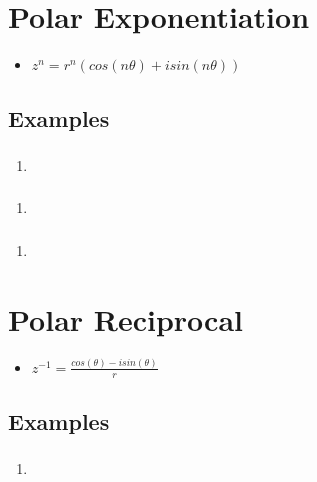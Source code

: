 \documentclass{report}
\renewcommand{\sin}[1]{sin(#1)}
\renewcommand{\cos}[1]{cos(#1)}
\begin{document}
        \section{Polar Exponentiation}
            \begin{itemize}
                \item $z^n=r^n(\cos{n\theta}+i\sin{n\theta})$
            \end{itemize}
            \subsection{Examples}
                \subsubsection{}
                    \begin{enumerate}
                        \item 
                    \end{enumerate}
                \subsubsection{}
                    \begin{enumerate}
                        \item 
                    \end{enumerate}
                \subsubsection{}
                    \begin{enumerate}
                        \item 
                    \end{enumerate}
        \section{Polar Reciprocal}
            \begin{itemize}
                \item $z^{-1}=\frac{\cos{\theta}-i\sin{\theta}}{r}$
            \end{itemize}
            \subsection{Examples}
                \subsubsection{}
                    \begin{enumerate}
                        \item 
                    \end{enumerate}
\end{document}
